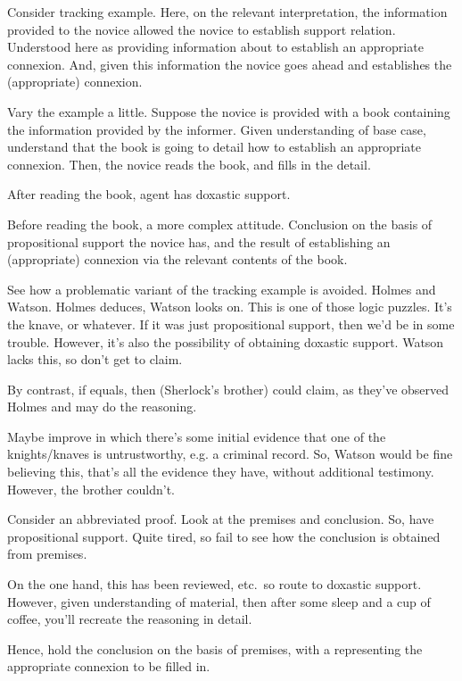 \begin{note}
  Consider tracking example.
  Here, on the relevant interpretation, the information provided to the novice allowed the novice to establish support relation.
  Understood here as providing information about to establish an appropriate connexion.
  And, given this information the novice goes ahead and establishes the (appropriate) connexion.

  Vary the example a little.
  Suppose the novice is provided with a book containing the information provided by the informer.
  Given understanding of base case, understand that the book is going to detail how to establish an appropriate connexion.
  Then, the novice reads the book, and fills in the detail.

  After reading the book, agent has doxastic support.

  Before reading the book, a more complex attitude.
  Conclusion on the basis of propositional support the novice has, and the result of establishing an (appropriate) connexion via the relevant contents of the book.
\end{note}

\begin{note}
  See how a problematic variant of the tracking example is avoided.
  Holmes and Watson.
  Holmes deduces, Watson looks on.
  This is one of those logic puzzles.
  It's the knave, or whatever.
  If it was just propositional support, then we'd be in some trouble.
  However, it's also the possibility of obtaining doxastic support.
  Watson lacks this, so don't get to claim.

  By contrast, if equals, then (Sherlock's brother) could claim, as they've observed Holmes and may do the reasoning.

  Maybe improve in which there's some initial evidence that one of the knights/knaves is untrustworthy, e.g. a criminal record.
  So, Watson would be fine believing this, that's all the evidence they have, without additional testimony.
  However, the brother couldn't.
\end{note}

\begin{note}
  Consider an abbreviated proof.
  Look at the premises and conclusion.
  So, have propositional support.
  Quite tired, so fail to see how the conclusion is obtained from premises.

  On the one hand, this has been reviewed, etc.\ so route to doxastic support.
  However, given understanding of material, then after some sleep and a cup of coffee, you'll recreate the reasoning in detail.

  Hence, hold the conclusion on the basis of premises, with a \future{} representing the appropriate connexion to be filled in.
\end{note}


